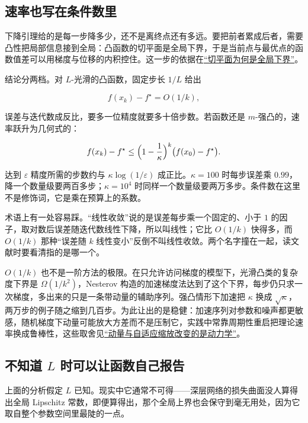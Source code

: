 \subsection{速率也写在条件数里}

下降引理给的是每一步降多少，还不是离终点还有多远。要把前者累成后者，需要凸性把局部信息接到全局：凸函数的切平面是全局下界，于是当前点与最优点的函数值差可以用梯度与位移的内积控住。这一步的依据在\hyperref[sec:09-Convex-Optimization/03-Convex-Functions/02]{``切平面为何是全局下界''}。

结论分两档。对 \(L\)-光滑的凸函数，固定步长 \(1/L\) 给出

\[
f(x_k)-f^\star=O(1/k),
\]

误差与迭代数成反比，要多一位精度就要多十倍步数。若函数还是 \(m\)-强凸的，速率跃升为几何式的：

\[
f(x_k)-f^\star\le\Bigl(1-\frac{1}{\kappa}\Bigr)^k\bigl(f(x_0)-f^\star\bigr).
\]

达到 \(\varepsilon\) 精度所需的步数约与 \(\kappa\log(1/\varepsilon)\) 成正比。\(\kappa=100\) 时每步误差乘 \(0.99\)，降一个数量级要两百多步；\(\kappa=10^4\) 时同样一个数量级要两万多步。条件数在这里不是修饰词，它是乘在预算上的系数。

术语上有一处容易踩。``线性收敛''说的是误差每步乘一个固定的、小于 \(1\) 的因子，取对数后误差随迭代数线性下降，所以叫线性；它比 \(O(1/k)\) 快得多，而 \(O(1/k)\) 那种``误差随 \(k\) 线性变小''反倒不叫线性收敛。两个名字撞在一起，读文献时要看清指的是哪一个。

\(O(1/k)\) 也不是一阶方法的极限。在只允许访问梯度的模型下，光滑凸类的复杂度下界是 \(\Omega(1/k^2)\)，Nesterov 构造的加速梯度法达到了这个下界，每步仍只求一次梯度，多出来的只是一条带动量的辅助序列。强凸情形下加速把 \(\kappa\) 换成 \(\sqrt{\kappa}\)，两万步的例子随之缩到几百步。为此让出的是稳健：加速序列对参数和噪声都更敏感，随机梯度下动量可能放大方差而不是压制它，实践中常靠周期性重启把理论速率换成鲁棒性，这些取舍见\hyperref[sec:09-Convex-Optimization/08-Nonconvex-and-Stochastic-Optimization/05]{``动量与自适应缩放改变的是动力学''}。

\subsection{\texorpdfstring{不知道 \(L\) 时可以让函数自己报告}{不知道 L 时可以让函数自己报告}}

上面的分析假定 \(L\) 已知。现实中它通常不可得——深层网络的损失曲面没人算得出全局 Lipschitz 常数，即便算得出，那个全局上界也会保守到毫无用处，因为它取自整个参数空间里最陡的一点。

